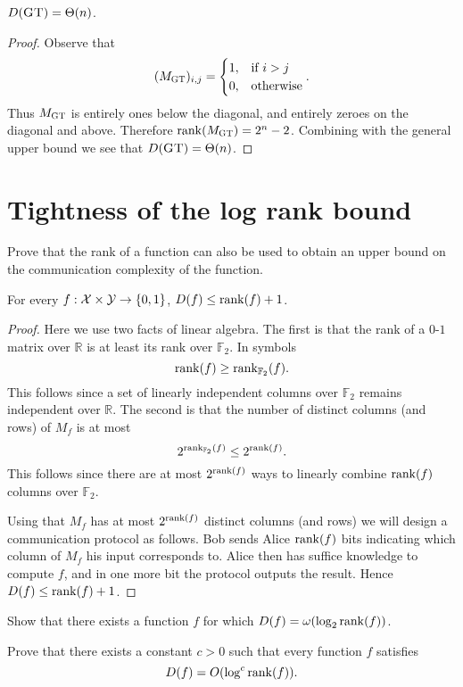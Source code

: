 \begin{theorem}
$D(\textsc{GT}) = \Theta(n)$.
\end{theorem}

\begin{proof}
	Observe that 
	$$(M_{\textsc{GT}})_{i,j} = \begin{cases}
		1, &\text{if } i>j \\
		0, &\text{otherwise}
	\end{cases}.$$
	Thus $M_{\textsc{GT}}$ is entirely ones below the diagonal, and entirely zeroes on the diagonal and above. Therefore $\mathrm{rank}(M_{\textsc{GT}}) = 2^n-2$. Combining with the general upper bound we see that $D(\textsc{GT}) = \Theta(n)$.
\end{proof}



\newpage \section{Tightness of the log rank bound}

Prove that the rank of a function can also be used to obtain an upper bound on the communication complexity of the function.

\begin{theorem}
For every $f : \mathcal{X} \times \mathcal{Y} \to \{0,1\}$, $D(f) \le \mathrm{rank}(f) + 1$.
\end{theorem}

\begin{proof}
Here we use two facts of linear algebra. The first is that the rank of a $0$-$1$ matrix over $\mathbb{R}$ is at least its rank over $\mathbb{F}_2$. In symbols $$\mathrm{rank}(f) \geq \mathrm{rank}_{\mathbb{F}_2}(f).$$
This follows since a set of linearly independent columns over $\mathbb{F}_2$ remains independent over $\mathbb{R}$.
The second is that the number of distinct columns (and rows) of $M_f$ is at most $$2^{\mathrm{rank}_{\mathbb{F}_2}(f)} \leq 2^{\mathrm{rank}(f)}.$$
This follows since there are at most $2^{\mathrm{rank}(f)}$ ways to linearly combine $\mathrm{rank}(f)$ columns over $\mathbb{F}_2$.

Using that $M_f$ has at most $2^{\mathrm{rank}(f)}$ distinct columns (and rows) we will design a communication protocol as follows. Bob sends Alice $\mathrm{rank}(f)$ bits indicating which column of $M_f$ his input corresponds to. Alice then has suffice knowledge to compute $f$, and in one more bit the protocol outputs the result. Hence
$D(f) \leq \mathrm{rank}(f) + 1$.
\end{proof}

\exercises

\begin{exercise} %
Show that there exists a function $f$ for which $D(f) = \omega( \log_2 \mathrm{rank}(f) )$.
\end{exercise}

\begin{open}
Prove that there exists a constant $c > 0$ such that every function $f$ satisfies
\[
D(f) = O( \log^c \mathrm{rank}(f)).
\]
\end{open}

